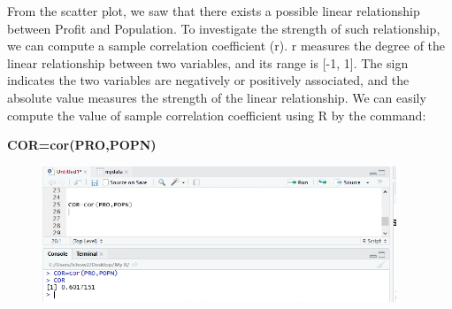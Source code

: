 \documentclass[a4paper]{report}
\begin{document}
        \begin{flushleft}
        From the scatter plot, we saw that there exists a possible linear relationship between Profit and Population. To investigate the strength of such relationship, we can compute a sample correlation coefficient (r). r measures the degree of the linear relationship between two variables, and its range is [-1, 1]. The sign indicates the two variables are negatively or positively associated, and the absolute value measures the strength of the linear relationship. We can easily compute the value of sample correlation coefficient using R by the command:
        \begin{center}
           \textbf{ COR=cor(PRO,POPN)}
        \end{center}
        
                \includegraphics[width=5in,height=1.6in]{images/COR1.png}
        \end{flushleft}
        
\end{document}
